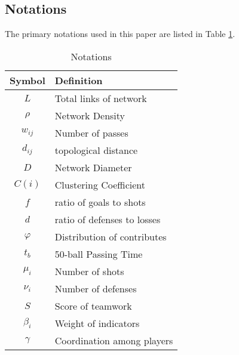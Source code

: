 \documentclass[12pt]{article}  %
\begin{document}
\subsection{Notations}
The primary notations used in this paper are listed in Table \ref{tb:notation}.
\begin{table}[!htbp]
\begin{center}
\caption{Notations}
\begin{tabular}{c|l}
	\toprule
	\multicolumn{1}{m{3cm}}{\centering Symbol}
	&\multicolumn{1}{m{8cm}}{\centering Definition}\\
	\midrule
    $L$& Total links of network \\
    $\rho$& Network Density \\
    $w_{ij}$& Number of passes\\
    $d_{ij}$& topological distance \\
    $D$ & Network Diameter \\
    $C(i)$& Clustering Coefficient\\
    $f$ & ratio of goals to shots\\
    $d$ & ratio of defenses to losses\\
    $\varphi$& Distribution of contributes\\
    $t_b$&50-ball Passing Time\\
    $\mu_i$& Number of shots\\
    $\nu_i$& Number of defenses\\    
    $S$ & Score of teamwork\\
    $\beta_i$ & Weight of indicators \\
    $\gamma$& Coordination among players\\
    \bottomrule
\end{tabular}\label{tb:notation}
\end{center}
\end{table}


    
\end{document}
